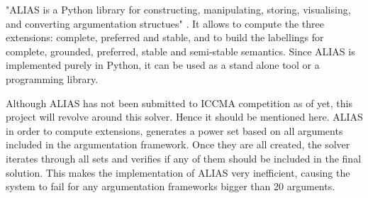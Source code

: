 "ALIAS is a Python library for constructing, manipulating, storing, visualising, and converting argumentation structues" \citep{alias}. It allows to compute the three extensions: complete, preferred and stable, and to build the labellings for complete, grounded, preferred, stable and semi-stable semantics. Since ALIAS is implemented purely in Python, it can be used as a stand alone tool or a programming library. 

Although ALIAS has not been submitted to ICCMA competition as of yet, this project will revolve around this solver. Hence it should be mentioned here. ALIAS in order to compute extensions, generates a power set based on all arguments included in the argumentation framework. Once they are all created, the solver iterates through all sets and verifies if any of them should be included in the final solution. This makes the implementation of ALIAS very inefficient, causing the system to fail for any argumentation frameworks bigger than 20 arguments. 

